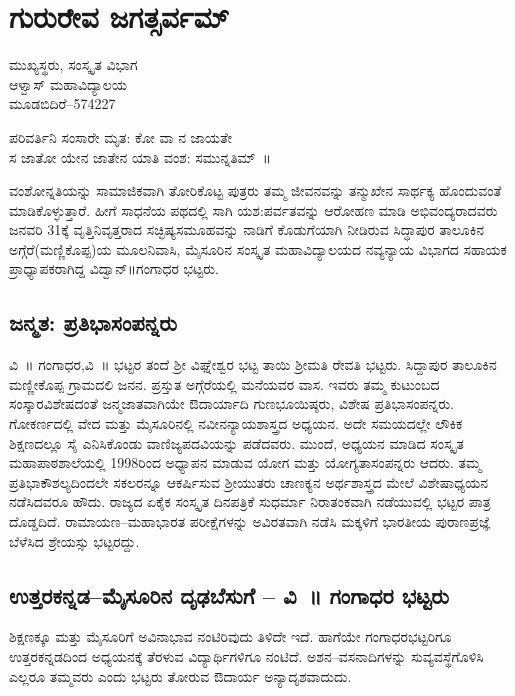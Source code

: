 {\fontsize{14}{16}\selectfont
\chapter{ಗುರುರೇವ ಜಗತ್ಸರ್ವಮ್}

\begin{center}
\smallskip
ಮುಖ್ಯಸ್ಥರು, ಸಂಸ್ಕೃತ ವಿಭಾಗ \\
ಆಳ್ವಾಸ್ ಮಹಾವಿದ್ಯಾಲಯ\\
ಮೂಡಬಿದಿರೆ–574227
\addrule
\end{center}
\begin{center}
ಪರಿವರ್ತಿನಿ ಸಂಸಾರೇ ಮೃತ: ಕೋ ವಾ ನ ಜಾಯತೇ\\
ಸ ಜಾತೋ ಯೇನ ಜಾತೇನ ಯಾತಿ ವಂಶ: ಸಮುನ್ನತಿಮ್~॥
\end{center}
ವಂಶೋನ್ನತಿಯನ್ನು ಸಾಮಾಜಿಕವಾಗಿ ತೋರಿಕೊಟ್ಟ ಪುತ್ರರು ತಮ್ಮ ಜೀವನವನ್ನು ತನ್ಮುಖೇನ ಸಾರ್ಥಕ್ಯ ಹೊಂದುವಂತೆ ಮಾಡಿಕೊಳ್ಳುತ್ತಾರೆ. ಹೀಗೆ ಸಾಧನೆಯ ಪಥದಲ್ಲಿ ಸಾಗಿ ಯಶ:ಪರ್ವತವನ್ನು ಆರೋಹಣ ಮಾಡಿ ಅಭಿವಂದ್ಯರಾದವರು ಜನವರಿ 31ಕ್ಕೆ ವೃತ್ತಿನಿವೃತ್ತರಾದ ಸಚ್ಛಿಷ್ಯಸಮೂಹವನ್ನು ನಾಡಿಗೆ ಕೊಡುಗೆಯಾಗಿ ನೀಡಿರುವ ಸಿದ್ಧಾಪುರ ತಾಲೂಕಿನ ಅಗ್ಗೆರೆ(ಮಣ್ಣಿಕೊಪ್ಪ)ಯ ಮೂಲನಿವಾಸಿ, ಮೈಸೂರಿನ ಸಂಸ್ಕೃತ ಮಹಾವಿದ್ಯಾಲಯದ ನವ್ಯನ್ಯಾಯ ವಿಭಾಗದ ಸಹಾಯಕ ಪ್ರಾಧ್ಯಾಪಕರಾಗಿದ್ದ ವಿದ್ವಾನ್॥ಗಂಗಾಧರ ಭಟ್ಟರು.

\section*{ಜನ್ಮತ: ಪ್ರತಿಭಾಸಂಪನ್ನರು}

ವಿ~॥ ಗಂಗಾಧರ,ವಿ~॥ ಭಟ್ಟರ ತಂದೆ ಶ್ರೀ ವಿಘ್ನೇಶ್ವರ ಭಟ್ಟ ತಾಯಿ ಶ್ರೀಮತಿ ರೇವತಿ ಭಟ್ಟರು. ಸಿದ್ದಾಪುರ ತಾಲೂಕಿನ ಮಣ್ಣೀಕೊಪ್ಪ ಗ್ರಾಮದಲಿ ಜನನ. ಪ್ರಸ್ತುತ ಅಗ್ಗೆರೆಯಲ್ಲಿ ಮನೆಯವರ ವಾಸ. ಇವರು ತಮ್ಮ ಕುಟುಂಬದ ಸಂಸ್ಕಾರವಿಶೇಷದಂತೆ ಜನ್ಮಜಾತವಾಗಿಯೇ ಔದಾರ್ಯಾದಿ ಗುಣಭೂಯಿಷ್ಠರು, ವಿಶೇಷ ಪ್ರತಿಭಾಸಂಪನ್ನರು. ಗೋಕರ್ಣದಲ್ಲಿ ವೇದ ಮತ್ತು ಮೈಸೂರಿನಲ್ಲಿ ನವೀನನ್ಯಾಯಶಾಸ್ತ್ರದ ಅಧ್ಯಯನ. ಅದೇ ಸಮಯದಲ್ಲೇ ಲೌಕಿಕ ಶಿಕ್ಷಣದಲ್ಲೂ ಸೈ ಎನಿಸಿಕೊಂಡು ವಾಣಿಜ್ಯಪದವಿಯನ್ನು ಪಡೆದವರು.  ಮುಂದೆ, ಅಧ್ಯಯನ ಮಾಡಿದ ಸಂಸ್ಕೃತ ಮಹಾಪಾಠಶಾಲೆಯಲ್ಲಿ 1998ರಿಂದ ಅಧ್ಯಾಪನ ಮಾಡುವ ಯೋಗ ಮತ್ತು ಯೋಗ್ಯತಾಸಂಪನ್ನರು ಆದರು. ತಮ್ಮ ಪ್ರತಿಭಾಕೌಶಲ್ಯದಿಂದಲೇ ಸಕಲರನ್ನೂ ಆಕರ್ಷಿಸುವ ಶ್ರೀಯುತರು ಚಾಣಕ್ಯನ ಅರ್ಥಶಾಸ್ತ್ರದ ಮೇಲೆ ವಿಶೇಷಾಧ್ಯಯನ ನಡೆಸಿದವರೂ ಹೌದು. ರಾಜ್ಯದ ಏಕೈಕ ಸಂಸ್ಕೃತ ದಿನಪತ್ರಿಕೆ ಸುಧರ್ಮಾ ನಿರಾತಂಕವಾಗಿ ನಡೆಯುವಲ್ಲಿ ಭಟ್ಟರ ಪಾತ್ರ ದೊಡ್ಡದಿದೆ. ರಾಮಾಯಣ–ಮಹಾಭಾರತ ಪರೀಕ್ಷೆಗಳನ್ನು ಅವಿರತವಾಗಿ ನಡೆಸಿ ಮಕ್ಕಳಿಗೆ ಭಾರತೀಯ ಪುರಾಣಪ್ರಜ್ಞೆ ಬೆಳೆಸಿದ ಶ್ರೇಯಸ್ಸು ಭಟ್ಟರದ್ದು.

\section*{ಉತ್ತರಕನ್ನಡ–ಮೈಸೂರಿನ ದೃಢಬೆಸುಗೆ – ವಿ~॥ ಗಂಗಾಧರ ಭಟ್ಟರು}

ಶಿಕ್ಷಣಕ್ಕೂ ಮತ್ತು ಮೈಸೂರಿಗೆ ಅವಿನಾಭಾವ ನಂಟಿರಿವುದು ತಿಳಿದೇ ಇದೆ. ಹಾಗೆಯೇ  ಗಂಗಾಧರಭಟ್ಟರಿಗೂ ಉತ್ತರಕನ್ನಡದಿಂದ ಅಧ್ಯಯನಕ್ಕೆ ತೆರಳುವ ವಿದ್ಯಾರ್ಥಿಗಳಿಗೂ ನಂಟಿದೆ. ಅಶನ–ವಸನಾದಿಗಳನ್ನು ಸುವ್ಯವಸ್ಥೆಗೊಳಿಸಿ ಎಲ್ಲರೂ ತಮ್ಮವರು ಎಂದು ಭಟ್ಟರು ತೋರುವ ಔದಾರ್ಯ ಅನ್ಯಾದೃಶವಾದುದು.

}
